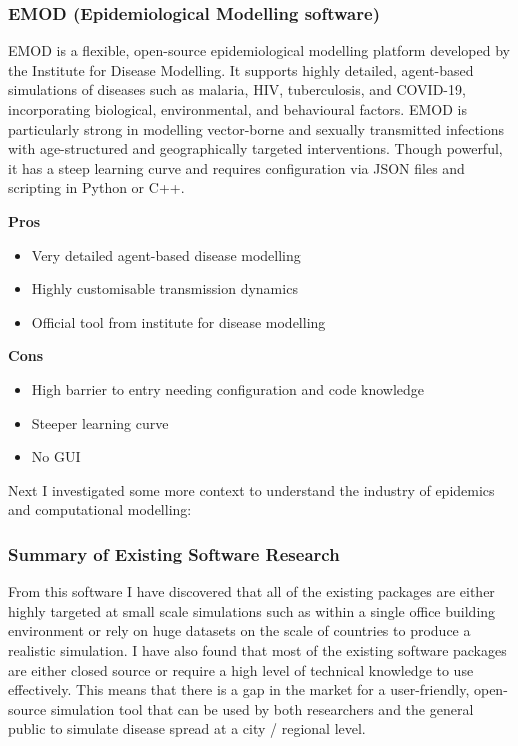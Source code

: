 \subsubsection*{EMOD (Epidemiological Modelling software)}
EMOD is a flexible, open-source epidemiological modelling platform developed by the Institute for Disease Modelling. It supports highly detailed, agent-based simulations of diseases such as malaria, HIV, tuberculosis, and COVID-19, incorporating biological, environmental, and behavioural factors. EMOD is particularly strong in modelling vector-borne and sexually transmitted infections with age-structured and geographically targeted interventions. Though powerful, it has a steep learning curve and requires configuration via JSON files and scripting in Python or C++.

\noindent
\begin{minipage}[t]{0.48\textwidth}
\textbf{Pros}
\begin{itemize}
    \item Very detailed agent-based disease modelling
    \item Highly customisable transmission dynamics
    \item Official tool from institute for disease modelling
\end{itemize}
\end{minipage}
\hfill
\begin{minipage}[t]{0.48\textwidth}
\textbf{Cons}
\begin{itemize}
    \item High barrier to entry needing configuration and code knowledge
    \item Steeper learning curve
    \item No GUI
\end{itemize}
\end{minipage}

Next I investigated some more context to understand the industry of epidemics and computational modelling:

\subsubsection*{Summary of Existing Software Research}
From this software I have discovered that all of the existing packages are either highly targeted at small scale simulations such as within a single office building environment or rely on huge datasets on the scale of countries to produce a realistic simulation. I have also found that most of the existing software packages are either closed source or require a high level of technical knowledge to use effectively. This means that there is a gap in the market for a user-friendly, open-source simulation tool that can be used by both researchers and the general public to simulate disease spread at a city / regional level.

